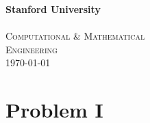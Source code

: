 \begin{titlepage}
{\color{sured} \LARGE \bf{Stanford University}}\\[0.5cm] %
\sulogo\\[1.0cm]


\textsc{\large Computational \& Mathematical\\ Engineering}\\[0.5cm] %



{\large \today}\\[3cm] %


\vfill %

\end{titlepage}

\section*{Problem I}

\cite{foo}




